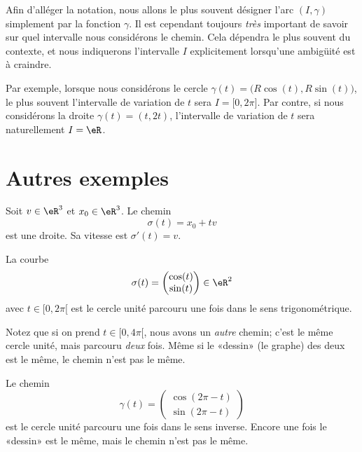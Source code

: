 \newcommand{\CaptionFigExempleArcParam}{Des exemples d'arcs paramétrées. Ceux ne sont pas des graphes.}


\begin{remark}
	Afin d'alléger la notation, nous allons le plus souvent désigner l'arc \( (I,\gamma)\) simplement par la fonction \( \gamma\). Il est cependant toujours \emph{très} important de savoir sur quel intervalle nous considérons le chemin. Cela dépendra le plus souvent du contexte, et nous indiquerons l'intervalle \( I\) explicitement lorsqu'une ambigüité est à craindre.

	Par exemple, lorsque nous considérons le cercle \( \gamma(t)=\big( R\cos(t),R\sin(t) \big)\), le plus souvent l'intervalle de variation de \( t\) sera \( I=\mathopen[ 0 , 2\pi \mathclose]\). Par contre, si nous considérons la droite \( \gamma(t)=(t,2t)\), l'intervalle de variation de \( t\) sera naturellement \( I=\eR\).
\end{remark}

\section{Autres exemples}

\begin{example}
	Soit \( v\in\eR^3\) et \( x_0\in\eR^3\). Le chemin
	\begin{equation}
		\sigma(t)=x_0+tv
	\end{equation}
	est une droite. Sa vitesse est \( \sigma'(t)=v\).
\end{example}

\begin{example}
	La courbe
	\begin{equation}
		\sigma(t)=\begin{pmatrix}
			\cos(t) \\
			\sin(t)
		\end{pmatrix}\in\eR^2
	\end{equation}
	avec \( t\in\mathopen[ 0 , 2\pi [\) est le cercle unité parcouru une fois dans le sens trigonométrique.

	Notez que si on prend \( t\in\mathopen[ 0 , 4\pi [\), nous avons un \emph{autre} chemin; c'est le même cercle unité, mais parcouru \emph{deux} fois. Même si le «dessin» (le graphe) des deux est le même, le chemin n'est pas le même.

	Le chemin
	\begin{equation}
		\gamma(t)=\begin{pmatrix}
			\cos(2\pi-t) \\
			\sin(2\pi-t)
		\end{pmatrix}
	\end{equation}
	est le cercle unité parcouru une fois dans le sens inverse. Encore une fois le «dessin» est le même, mais le chemin n'est pas le même.
\end{example}

